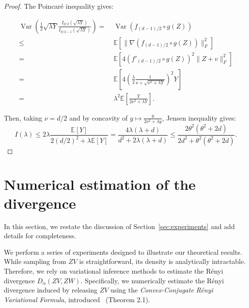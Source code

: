 \documentclass{article}
\theoremstyle{plain}
\theoremstyle{definition}
\theoremstyle{remark}
\DeclareMathOperator{\Var}{Var}
\begin{document}
\begin{proof}
The Poincaré inequality gives:

\begin{align*}
    \Var\left( \frac{1}{2} \sqrt{\lambda Y} \frac{I_{d/2}(\sqrt{\lambda Y})}{I_{d/2-1}(\sqrt{\lambda Y})} \right)  =& \; \Var\left(f_{(d-1)/2} \circ g(Z) \right) \\ \leq&\; \mathbb{E}\left[\|\nabla (f_{(d-1)/2} \circ g (Z)) \|_F^2\right] \\ 
    =&\; \mathbb{E}\left[4 (f'_{(d-1)/2} \circ g (Z))^2 \|Z+v\|_F^2\right]\\
    =&\; \mathbb{E}\left[ 4\left(\frac{\lambda}{2}\frac{1}{\nu + \sqrt{\nu^2 + \lambda Y}}\right)^2 Y\right]\\
    =& \;\lambda^2\mathbb{E}\left[ \frac{Y}{2\nu^2 +  \lambda Y} \right].
\end{align*}

Then, taking $\nu = d/2$ and by concavity of $y \mapsto \frac{y}{2\nu^2 + \lambda y}$, Jensen inequality gives:
\[I(\lambda) \leq 2\lambda\frac{\mathbb{E}\left[Y\right]}{2(d/2)^2 +  \lambda \mathbb{E}\left[Y\right]} =  \frac{4\lambda(\lambda + d)}{d^2 +  2\lambda(\lambda + d)}\leq \frac{2\theta^2(\theta^2 + 2d)}{2d^2 +  \theta^2(\theta^2 + 2d)}.\]

\end{proof}



\newpage






\section{Numerical estimation of the divergence}
\label{app:experiments}
In this section, we restate the discussion of Section~\ref{sec:experiments} and add details for completeness.

We perform a series of experiments designed to illustrate our theoretical results. While sampling from $ZV$ is straightforward, its density is analytically intractable. Therefore, we rely on variational inference methods to estimate the Rényi divergence $D_\alpha(ZV,ZW)$. Specifically, we numerically estimate the Rényi divergence induced by releasing $ZV$ using the \emph{Convex-Conjugate Rényi Variational Formula}, introduced~\cite{birrell2023} (Theorem 2.1).
\end{document}
